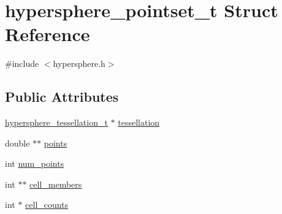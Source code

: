 \hypertarget{structhypersphere__pointset__t}{
\section{hypersphere\_\-pointset\_\-t Struct Reference}
\label{structhypersphere__pointset__t}
}


{\ttfamily \#include $<$hypersphere.h$>$}

\subsection*{Public Attributes}
\begin{DoxyCompactItemize}
\item 
\hyperlink{structhypersphere__tessellation__t}{hypersphere\_\-tessellation\_\-t} $\ast$ \hyperlink{structhypersphere__pointset__t_ab8386b250d4bfe0e7738c662c414c59f}{tessellation}
\item 
double $\ast$$\ast$ \hyperlink{structhypersphere__pointset__t_a3930068cd0836f339792ee59840b1713}{points}
\item 
int \hyperlink{structhypersphere__pointset__t_a35cb19e7a308c03236f28540a867e167}{num\_\-points}
\item 
int $\ast$$\ast$ \hyperlink{structhypersphere__pointset__t_aa7cfbde979cf3d0cda21b816b2cc1672}{cell\_\-members}
\item 
int $\ast$ \hyperlink{structhypersphere__pointset__t_aaf511e7f891ea0d2c9bb8a8e94a4b085}{cell\_\-counts}
\end{DoxyCompactItemize}


